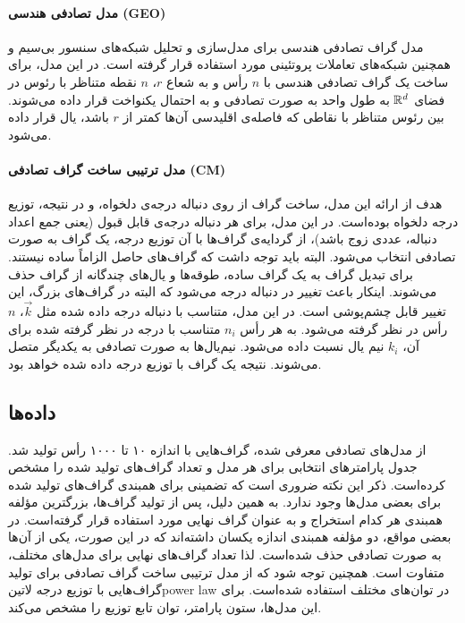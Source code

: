 \paragraph{مدل تصادفی هندسی (GEO)}
مدل گراف تصادفی هندسی برای مدل‌سازی و تحلیل شبکه‌های سنسور بی‌سیم و همچنین شبکه‌های تعاملات پروتئینی مورد استفاده قرار گرفته است. در این مدل، 
برای ساخت یک گراف تصادفی هندسی با $n$ رأس و به شعاع $r$، $n$ نقطه متناظر با رئوس در فضای $\mathbb{R}^d$ به طول واحد به صورت تصادفی و به احتمال یکنواخت قرار داده می‌شوند. بین رئوس متناظر با نقاطی که فاصله‌ی اقلیدسی آن‌ها کمتر از $r$ باشد، یال قرار داده می‌شود.

\paragraph{مدل ترتیبی ساخت گراف تصادفی (CM)}
هدف از ارائه این مدل، ساخت گراف از روی دنباله درجه‌ی دلخواه، و در نتیجه، توزیع درجه دلخواه بوده‌است. در این مدل، برای هر دنباله درجه‌ی قابل قبول (یعنی جمع اعداد دنباله، عددی زوج باشد)، از گردایه‌ی گراف‌ها با آن توزیع درجه، یک گراف به صورت تصادفی انتخاب می‌شود. البته باید توجه داشت که گراف‌های حاصل الزاماً ساده نیستند. برای تبدیل گراف به یک گراف ساده، طوقه‌ها و یال‌های چندگانه از گراف حذف می‌شوند. اینکار باعث تغییر در دنباله درجه می‌شود که البته در گراف‌های بزرگ، این تغییر قابل چشم‌پوشی است. در این مدل، متناسب با دنباله درجه داده شده مثل $\vec{k}$، $n$ رأس در نظر گرفته می‌شود. به هر رأس $n_i$ متناسب با درجه در نظر گرفته شده برای آن، $k_i$ نیم یال نسبت داده می‌شود. نیم‌یال‌ها به صورت تصادفی به یکدیگر متصل می‌شوند. نتیجه یک گراف با توزیع درجه داده‌ شده خواهد بود.

\subsection{داده‌‌ها}
از مدل‌های تصادفی معرفی شده، گراف‌هایی با اندازه ۱۰ تا ۱۰۰۰ رأس تولید شد. جدول  پارامترهای انتخابی برای هر مدل و تعداد گراف‌های تولید شده را مشخص کرده‌است. ذکر این نکته ضروری است که تضمینی برای همبندی گراف‌های تولید شده برای بعضی مدل‌ها وجود ندارد. به همین دلیل، پس از تولید گراف‌ها، بزرگترین مؤلفه همبندی هر کدام استخراج و به عنوان گراف نهایی مورد استفاده قرار گرفته‌است. در بعضی مواقع، دو مؤلفه همبندی اندازه یکسان داشته‌اند که در این صورت، یکی از آن‌ها به صورت تصادفی حذف شده‌است. لذا تعداد گراف‌های نهایی برای مدل‌های مختلف، متفاوت است. همچنین توجه شود که از مدل ترتیبی ساخت گراف تصادفی برای تولید گراف‌هایی با توزیع درجه ‌لاتین{power law} در توان‌های مختلف استفاده شده‌است. برای این مدل‌ها، ستون پارامتر، توان تابع توزیع را مشخص می‌کند.

